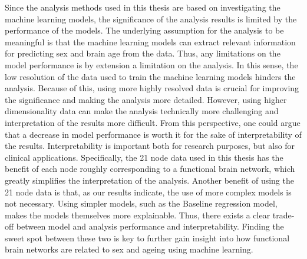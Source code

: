 Since the analysis methods used in this thesis are based on investigating the machine learning models, the significance of the analysis results is limited by the performance of the models. The underlying assumption for the analysis to be meaningful is that the machine learning models can extract relevant information for predicting sex and brain age from the data. Thus, any limitations on the model performance is by extension a limitation on the analysis. In this sense, the low resolution of the data used to train the machine learning models hinders the analysis. Because of this, using more highly resolved data is crucial for improving the significance and making the analysis more detailed. However, using higher dimensionality data can make the analysis technically more challenging and interpretation of the results more difficult. From this perspective, one could argue that a decrease in model performance is worth it for the sake of interpretability of the results. Interpretability is important both for research purposes, but also for clinical applications. Specifically, the 21 node data used in this thesis has the benefit of each node roughly corresponding to a functional brain network, which greatly simplifies the interpretation of the analysis. Another benefit of using the 21 node data is that, as our results indicate, the use of more complex models is not necessary. Using simpler models, such as the Baseline regression model, makes the models themselves more explainable. Thus, there exists a clear trade-off between model and analysis performance and interpretability. Finding the sweet spot between these two is key to further gain insight into how functional brain networks are related to sex and ageing using machine learning. 
















